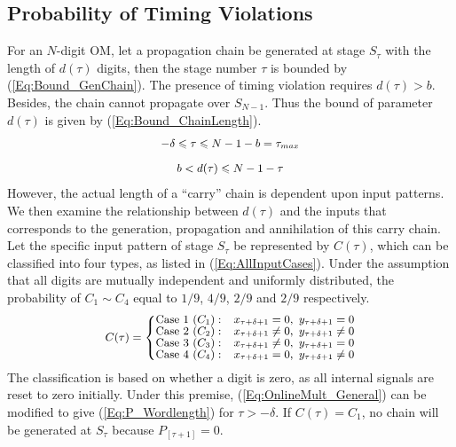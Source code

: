 \documentclass{acm_proc_article-sp}
\begin{document}
\subsection{Probability of Timing Violations}
For an $N$-digit OM, let a propagation chain be generated at stage $S_{\tau}$ with the length of $d(\tau)$ digits, then the stage number $\tau$ is bounded by (\ref{Eq:Bound_GenChain}). The presence of timing violation requires $d(\tau)>b$. Besides, the chain cannot propagate over $S_{N-1}$. Thus the bound of parameter $d(\tau)$ is given by (\ref{Eq:Bound_ChainLength}).
%
\begin{eqnarray}\label{Eq:Bound_GenChain}
\tiny
  -\delta\leqslant\tau\leqslant N-1-b=\tau_{max}
\end{eqnarray}
%
\vspace{-5ex}
\begin{eqnarray}\label{Eq:Bound_ChainLength}
  b<d(\tau)\leqslant N-1-\tau
\normalsize
\end{eqnarray}
%
However, the actual length of a ``carry'' chain is dependent upon input patterns. We then examine the relationship between $d(\tau)$ and the inputs that corresponds to the generation, propagation and annihilation of this carry chain. Let the specific input pattern of stage $S_{\tau}$ be represented by $C(\tau)$, which can be classified into four types, as listed in (\ref{Eq:AllInputCases}). Under the assumption that all digits are mutually independent and uniformly distributed, the probability of $C_1\sim C_4$ equal to $1/9$, $4/9$, $2/9$ and $2/9$ respectively.
%
\begin{eqnarray}\label{Eq:AllInputCases}
\footnotesize
  C(\tau)=\left\{\begin{matrix}
    \text{Case 1~(}C_1{):} & x_{\tau+\delta+1}=0,~y_{\tau+\delta+1}=0\\
    \text{Case 2~(}C_2{):} & x_{\tau+\delta+1}\neq0,~y_{\tau+\delta+1}\neq0\\
    \text{Case 3~(}C_3{):} & x_{\tau+\delta+1}\neq0,~y_{\tau+\delta+1}=0\\
    \text{Case 4~(}C_4{):} & x_{\tau+\delta+1}=0,~y_{\tau+\delta+1}\neq0
  \end{matrix}\right.
\normalsize
\end{eqnarray}
%
The classification is based on whether a digit is zero, as all internal signals are reset to zero initially. Under this premise, (\ref{Eq:OnlineMult_General}) can be modified to give (\ref{Eq:P_Wordlength}) for $\tau>-\delta$. If $C(\tau)=C_1$, no chain will be generated at $S_{\tau}$ because $P_{[\tau+1]}=0$.
\end{document}
